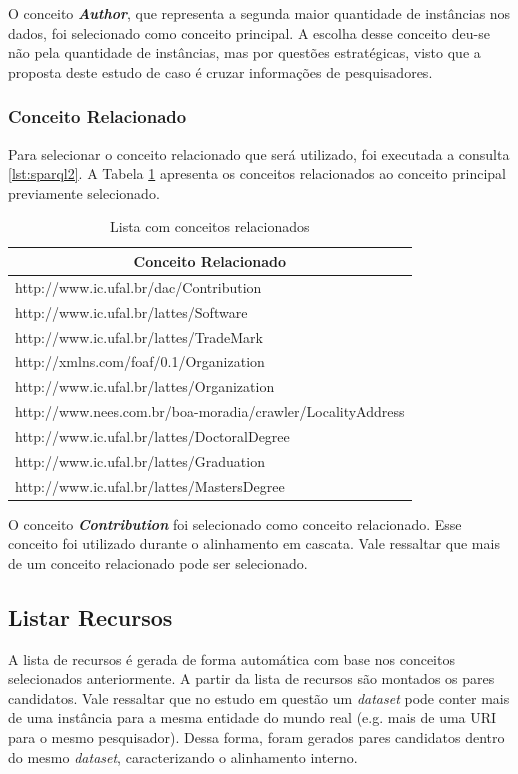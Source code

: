 O conceito \textbf{\textit{Author}}, que representa a segunda maior quantidade de instâncias nos dados, foi selecionado como conceito principal. A escolha desse conceito deu-se não pela quantidade de instâncias, mas por questões estratégicas, visto que a proposta deste estudo de caso é cruzar informações de pesquisadores.

\subsubsection{Conceito Relacionado}
Para selecionar o conceito relacionado que será utilizado, foi executada a consulta \ref{lst:sparql2}. A Tabela \ref{tab:estudo_sparql2} apresenta os conceitos relacionados ao conceito principal previamente selecionado.

\begin{table}[h]
	\centering
	\caption{Lista com conceitos relacionados}
	\label{tab:estudo_sparql2}
	\begin{tabular}{@{}|l|@{}}
		\hline
		\multicolumn{1}{|c|}{\textbf{Conceito Relacionado}}        \\ \hline
		http://www.ic.ufal.br/dac/Contribution                     \\ \hline
		http://www.ic.ufal.br/lattes/Software                      \\ \hline
		http://www.ic.ufal.br/lattes/TradeMark                     \\ \hline
		http://xmlns.com/foaf/0.1/Organization                     \\ \hline
		http://www.ic.ufal.br/lattes/Organization                  \\ \hline
		http://www.nees.com.br/boa-moradia/crawler/LocalityAddress \\ \hline
		http://www.ic.ufal.br/lattes/DoctoralDegree                \\ \hline
		http://www.ic.ufal.br/lattes/Graduation                    \\ \hline
		http://www.ic.ufal.br/lattes/MastersDegree                 \\ \hline
	\end{tabular}
\end{table}
 
O conceito \textbf{\textit{Contribution}} foi selecionado como conceito relacionado. Esse conceito foi utilizado durante o alinhamento em cascata. Vale ressaltar que mais de um conceito relacionado pode ser selecionado.
 
\subsection{Listar Recursos}
A lista de recursos é gerada de forma automática com base nos conceitos selecionados anteriormente. A partir da lista de recursos são montados os pares candidatos. Vale ressaltar que no estudo em questão um \textit{dataset} pode conter mais de uma instância para a mesma entidade do mundo real (e.g. mais de uma URI para o mesmo pesquisador). Dessa forma, foram gerados pares candidatos dentro do mesmo \textit{dataset}, caracterizando o alinhamento interno.

